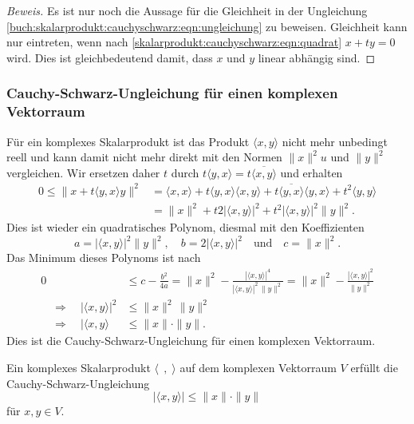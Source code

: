 \begin{proof}[Beweis]
Es ist nur noch die Aussage für die Gleichheit in der Ungleichung
\eqref{buch:skalarprodukt:cauchyschwarz:eqn:ungleichung}
zu beweisen.
Gleichheit kann nur eintreten, wenn nach
\eqref{skalarprodukt:cauchyschwarz:eqn:quadrat}
$x+ty=0$ wird.
Dies ist gleichbedeutend damit, dass $x$ und $y$ linear abhängig sind.
\end{proof}

%
%
\subsubsection{Cauchy-Schwarz-Ungleichung für einen komplexen Vektorraum}
Für ein komplexes Skalarprodukt ist das Produkt $\langle x,y\rangle$
nicht mehr unbedingt reell und kann damit nicht mehr direkt mit den
Normen $\|x\|^2u$ und $\|y\|^2$ vergleichen.
Wir ersetzen daher $t$ durch
$t\langle y,x\rangle=t\overline{\langle x,y\rangle}$
und erhalten 
\begin{align*}
0
\le
\|x+t\langle y,x\rangle y\|^2
&=
\langle x,x\rangle
+t\langle y,x\rangle \langle x,y\rangle
+t\overline{\langle y,x\rangle}\langle y,x\rangle
+t^2\langle y,y\rangle
\\
&=
\|x\|^2
+
t
2|\langle x,y\rangle|^2
+
t^2 |\langle x,y\rangle|^2
\|y\|^2.
\end{align*}
Dies ist wieder ein quadratisches Polynom, diesmal mit den Koeffizienten
\[
a= |\langle x,y\rangle|^2 \|y\|^2,
\quad
b= 2|\langle x,y\rangle|^2
\quad\text{und}\quad
c= \|x\|^2.
\]
Das Minimum dieses Polynoms ist nach
\begin{align*}
0
&\le
c-\frac{b^2}{4a}
=
\|x\|^2 - \frac{|\langle x,y\rangle|^4}{|\langle x,y\rangle|^2\,\|y\|^2}
=
\|x\|^2 - \frac{|\langle x,y\rangle|^2}{\|y\|^2}
\\
\quad\Rightarrow\quad
|\langle x,y\rangle|^2 &\le \|x\|^2\,\|y\|^2
\\
\quad\Rightarrow\quad
|\langle x,y\rangle &\le \|x\|\cdot\|y\|.
\end{align*}
Dies ist die Cauchy-Schwarz-Ungleichung für einen komplexen Vektorraum.

\begin{satz}
\label{buch:skalarprodukt:cauchy-schwarz:satz:komplex}
Ein komplexes Skalarprodukt $\langle\;\,,\;\rangle$ auf dem komplexen Vektorraum
$V$ erfüllt die Cauchy-Schwarz-Ungleichung
\[
|\langle x, y\rangle| \le \|x\|\cdot\|y\|
\]
für $x,y\in V$.
\end{satz}

